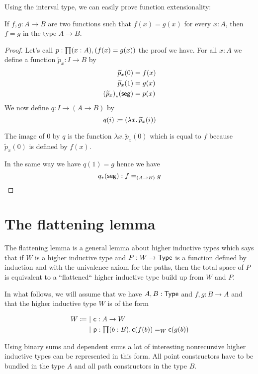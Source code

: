 Using the interval type, we can easily prove function extensionality:

\begin{lem}
  If $f,g:A\to{}B$ are two functions such that $f(x)=g(x)$ for every $x:A$, then
  $f=g$ in the type $A\to{}B$.
\end{lem}

\begin{proof}
  Let’s call $p:\prd{x:A}(f(x)=g(x))$ the proof we have. For all $x:A$ we define
  a function $\widetilde{p}_x:I\to{}B$ by
  \begin{align*}
    \widetilde{p}_x(0) &= f(x) \\
    \widetilde{p}_x(1) &= g(x) \\
    {(\widetilde{p}_x)}_{*}\!\left({\mathsf{seg}}\right) &= p(x)
  \end{align*}
  We now define $q:I\to(A\to{}B)$ by
  \[q(i)\coloneqq(\lambda{}x.\,\widetilde{p}_x(i))\]

  The image of $0$ by $q$ is the function $\lambda{}x.\,\widetilde{p}_x(0)$
  which is equal to $f$ because $\widetilde{p}_x(0)$ is defined by $f(x)$.

  In the same way we have $q(1)=g$ hence we have
  \[{q}_{*}\!\left({\mathsf{seg}}\right):f=_{(A\to{}B)}g\]
\end{proof}

\section{The flattening lemma}

The flattening lemma is a general lemma about higher inductive types which says
that if $W$ is a higher inductive type and $P:W\to\mathsf{Type}$ is a function defined
by induction and with the univalence axiom for the paths, then the total space
of $P$ is equivalent to a “flattened“ higher inductive type build up from $W$
and $P$.

In what follows, we will assume that we have $A,B:\mathsf{Type}$ and $f,g:B\to{}A$ and
that the higher inductive type $W$ is of the form

\newcommand{\cc}{\mathsf{c}}
\newcommand{\pp}{\mathsf{p}}
\newcommand{\cct}{\widetilde{\mathsf{c}}}
\newcommand{\ppt}{\widetilde{\mathsf{p}}}

\begin{align*}
  W \defeq&\ |\ \cc:A\to{}W\\
  &\ |\ \pp:\prd{b:B}\cc(f(b))=_W\cc(g(b))
\end{align*}

Using binary sums and dependent sums a lot of interesting nonrecursive higher
inductive types can be represented in this form. All point constructors have to
be bundled in the type $A$ and all path constructors in the type $B$.


